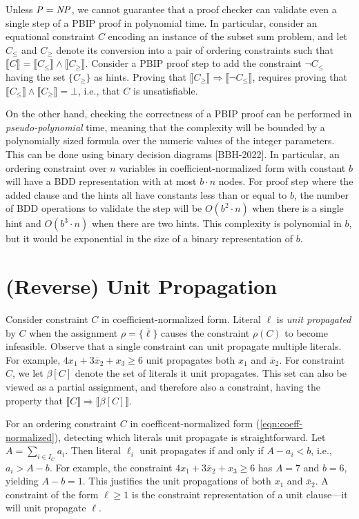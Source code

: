 \documentclass{easychair}
\newcommand{\boolnot}{\neg}
\newcommand{\nil}{\bot}
\renewcommand{\obar}[1]{\overline{#1}}
\newcommand{\lit}{\ell}
\newcommand{\assign}{\rho}
\newcommand{\indices}{I}
\newcommand{\uprop}[1]{\beta[#1]}
\newcommand{\imply}{\Rightarrow}
\newcommand{\func}[1]{\llbracket#1\rrbracket}
\begin{document}
Unless ${\it P} = {\it NP}$, we cannot guarantee that a proof checker
can validate even a single step of a PBIP proof in polynomial time.
In particular, consider an equational constraint $C$ encoding an
instance of the subset sum problem, and let $C_{\leq}$ and $C_{\geq}$
denote its conversion into a pair of ordering constraints such that
$\func{C} = \func{C_{\leq}} \land \func{C_{\geq}}$.  Consider a PBIP
proof step to add the constraint $\boolnot C_{\leq}$ having the set
$\{ C_{\geq} \}$ as hints.  Proving that $\func{C_{\geq}} \imply
\func{\boolnot C_{\leq}}$, requires proving that
$\func{C_{\leq}} \land \func{C_{\geq}} = \nil$, i.e., that $C$ is unsatisfiable.

On the other hand, checking the correctness of a PBIP proof can be
performed in {\em pseudo-polynomial} time, meaning that the complexity will
be bounded by a polynomially sized formula over the numeric values of
the integer parameters.  This can be done using binary decision
diagrams [BBH-2022].  In particular, an ordering constraint over $n$ variables in
coefficient-normalized form with constant $b$ will have a BDD
representation with at most $b \cdot n$ nodes.  For proof step where
the added clause and the hints all have constants less than or equal
to $b$, the number of BDD operations to validate the step will be
$O(b^{2} \cdot n)$ when there is a single hint and $O(b^{3} \cdot n)$
when there are two hints.  This complexity is polynomial in $b$, but
it would be exponential in the size of a binary representation of $b$.


\section{(Reverse) Unit Propagation}

Consider constraint $C$ in coefficient-normalized form.  Literal
$\lit$ is {\em unit propagated} by $C$ when the assignment $\assign = \{ \obar{\lit} \}$
causes the constraint $\assign(C)$ to become infeasible.
Observe that
a single constraint can unit propagate multiple literals.  For
example, $4 x_1 + 3 \obar{x}_2 + x_3 \geq 6$ unit propagates both
$x_1$ and $\obar{x}_2$.  For constraint $C$, we let $\uprop{C}$
denote the set of literals it unit propagates.  This set can also be
viewed as a partial assignment, and therefore also a constraint,
having the property that $\func{C} \imply \func{\uprop{C}}$.

For an ordering constraint $C$ in coefficent-normalized form (\ref{eqn:coeff-normalized}), detecting
which literals unit propagate is straightforward.  Let $A =
\sum_{i \in \indices_C} a_{i}$.  Then literal $\lit_{i}$ unit propagates if and only
if $A - a_{i} < b$, i.e., $a_{i} > A - b$.  For example, the constraint 
$4 x_1 + 3 \obar{x}_2 + x_3 \geq 6$ has $A = 7$ and $b=6$, yielding $A-b=1$.
This justifies the unit propagations of both $x_1$ and $\obar{x}_2$.
A constraint of the form $\lit \geq 1$ is the constraint representation of a unit clause---it will unit propagate $\lit$.
\end{document}
